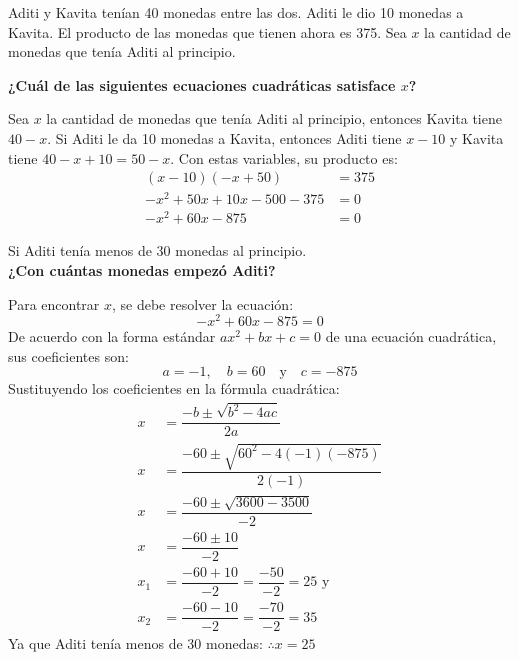 Aditi y Kavita tenían 40 monedas entre las dos. Aditi le dio 10 monedas a Kavita.
El producto de las monedas que tienen ahora es 375. Sea $x$ la cantidad de monedas que tenía Aditi al principio.

\begin{subparts}
    \subpart \textbf{¿Cuál de las siguientes ecuaciones cuadráticas satisface $x$?}
    \vspace{-0.4cm}

    \begin{solutionbox}{4.8cm}
        Sea $x$ la cantidad de monedas que tenía Aditi al principio, entonces Kavita tiene $40-x$. Si Aditi le da 10 monedas a Kavita, entonces Aditi tiene $x-10$ y Kavita tiene $40-x+10=50-x$. Con estas variables, su producto es:
        \begin{align*}
            (x-10)(-x+50)        & =375 \\
            -x^2+50x+10x-500-375 & = 0  \\
            -x^2+60x-875         & = 0
        \end{align*}
    \end{solutionbox}

    \subpart Si Aditi tenía menos de 30 monedas al principio.\\
    \textbf{¿Con cuántas monedas empezó Aditi?}

    \begin{solutionbox}{13cm}
        Para encontrar $x$, se debe resolver la ecuación:
        \[-x^2+60x-875  =0 \]
        De acuerdo con la forma estándar $ax^2 + bx + c = 0$ de una ecuación cuadrática, sus coeficientes son:
        \[a=-1, \quad b=60 \quad \text{y} \quad c=-875\]
        Sustituyendo los coeficientes en la fórmula cuadrática:
        \begin{align*}
            x   & = \dfrac{-b\pm\sqrt{b^2-4ac}}{2a}                  \\[1.2em]
            x   & = \dfrac{-60\pm\sqrt{60^2-4(-1)(-875)}}{2(-1)}     \\[1.2em]
            x   & = \dfrac{-60\pm\sqrt{3600-3500}}{-2}               \\[1.2em]
            x   & = \dfrac{-60\pm 10}{-2}                            \\[1.2em]
            x_1 & = \dfrac{-60+10}{-2}=\dfrac{-50}{-2}=25 \text{ y } \\[1.2em]
            x_2 & = \dfrac{-60-10}{-2}=\dfrac{-70}{-2}=35
        \end{align*}
        Ya que Aditi tenía menos de 30 monedas:
        $\therefore x=25$
    \end{solutionbox}
\end{subparts}